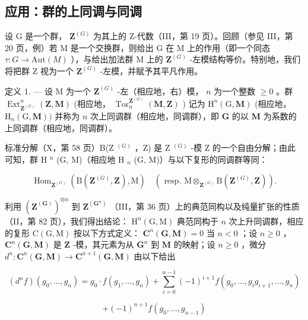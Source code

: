 \subsection{应用：群的上同调与同调}

设 G 是一个群， \(\mathbf{Z}^{(G)}\) 为其上的 Z-代数（III，第 19 页）。回顾（参见 III，第 20 页，例）若 M 是一个交换群，则给出 G 在 M 上的作用（即一个同态 \(\tau: G \to \text{Aut}(M)\) ），与给出加法群 M 上的 \(\mathbf{Z}^{(G)}\) -左模结构等价。特别地，我们将把群 Z 视为一个 \(\mathbf{Z}^{(G)}\) -左模，并赋予其平凡作用。

定义 1. --- 设 M 为一个 \(\mathbf{Z}^{(G)}\) -左（相应地，右）模， \(n\) 为一个整数 \(\geqslant 0\) 。群 \(\operatorname{Ext}_{\mathbf{Z}^{(G)}}^{n}(\mathbf{Z}, \mathbf{M})\) (相应地， \(\operatorname{Tor}_{n}^{\mathbf{Z}^{(G)}}(\mathbf{M}, \mathbf{Z})\) ) 记为 \(\mathrm{H}^{n}(\mathrm{G}, \mathbf{M})\) (相应地， \(\mathrm{H}_{n}(\mathrm{G}, \mathbf{M}))\) 并称为 \(n\) 次上同调群（相应地，同调群），即 \(\mathbf{G}\) 的以 \(\mathbf{M}\) 为系数的上同调群（相应地，同调群）。

标准分解（X，第 58 页）B(Z \(^{(G)}\) ，Z) 是 Z \(^{(G)}\) -模 Z 的一个自由分解；由此可知，群 H \(^{n}\) (G, M)（相应地 H \(_{n}\) (G, M)）与以下复形的同调群等同：

\[
\operatorname{Hom} _ {\mathbf {Z} ^ {(G)}} \left(\mathrm{B} (\mathbf {Z} ^ {(G)}, \mathbf {Z}), \mathrm{M}\right) \quad \left(\text { resp. } \mathrm{M} \otimes_ {\mathbf {Z} ^ {(G)}} \mathrm{B} (\mathbf {Z} ^ {(G)}, \mathbf {Z})\right).
\]

利用 \((\mathbf{Z}^{(\mathbf{G})})^{\otimes n}\) 到 \(\mathbf{Z}^{(\mathbf{G}^{n})}\) （III，第 36 页）上的典范同构以及纯量扩张的性质（II，第 82 页），我们得出结论： \(\mathrm{H}^n (\mathrm{G},\mathrm{M})\) 典范同构于 \(n\) 次上升同调群，相应的复形 \(\mathrm{C(G,M)}\) 按以下方式定义： \(\mathbf{C}^n (\mathbf{G},\mathbf{M}) = 0\) 当 \(n < 0\) ；设 \(n\geqslant 0\) ， \(\mathbf{C}^n (\mathbf{G},\mathbf{M})\) 是 \(\mathbf{Z}\) -模，其元素为从 \(\mathbf{G}^n\) 到 \(\mathbf{M}\) 的映射；设 \(n\geqslant 0\) ，微分 \(d^n:\mathbf{C}^n (\mathbf{G},\mathbf{M})\to \mathbf{C}^{n + 1}(\mathbf{G},\mathbf{M})\) 由以下给出

\[
(d ^ {n} f) (g _ {0}, \dots , g _ {n}) = g _ {0} \cdot f (g _ {1}, \dots , g _ {n}) + \sum_ {i = 0} ^ {n - 1} (- 1) ^ {i + 1} f (g _ {0}, \dots , g _ {i} g _ {i + 1}, \dots , g _ {n})
\]

\[
+ (- 1) ^ {n + 1} f \left(g _ {0}, \dots , g _ {n - 1}\right)
\]

